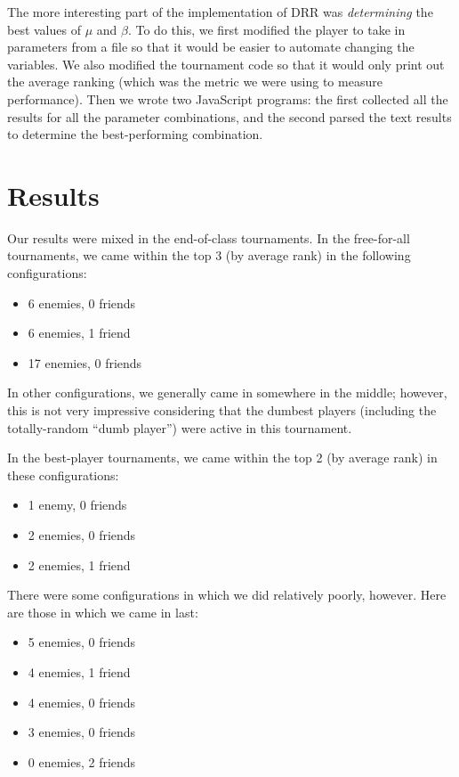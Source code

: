 \documentclass[
10pt, %
letterpaper, %
oneside, %
headinclude,footinclude, %
english
]{article}
\begin{document}
The more interesting part of the implementation of DRR was \textit{determining} the best values of $\mu$ and $\beta$. To do this, we first modified the player to take in parameters from a file so that it would be easier to automate changing the variables. We also modified the tournament code so that it would only print out the average ranking (which was the metric we were using to measure performance). Then we wrote two JavaScript programs: the first collected all the results for all the parameter combinations, and the second parsed the text results to determine the best-performing combination.

\section{Results}
Our results were mixed in the end-of-class tournaments. In the free-for-all tournaments, we came within the top 3 (by average rank) in the following configurations:
\begin{itemize}
  \item 6 enemies, 0 friends
  \item 6 enemies, 1 friend
  \item 17 enemies, 0 friends
\end{itemize}

In other configurations, we generally came in somewhere in the middle; however, this is not very impressive considering that the dumbest players (including the totally-random ``dumb player'') were active in this tournament.

In the best-player tournaments, we came within the top 2 (by average rank) in these configurations:
\begin{itemize}
  \item 1 enemy, 0 friends
  \item 2 enemies, 0 friends
  \item 2 enemies, 1 friend
\end{itemize}

There were some configurations in which we did relatively poorly, however. Here are those in which we came in last:
\begin{itemize}
  \item 5 enemies, 0 friends
  \item 4 enemies, 1 friend
  \item 4 enemies, 0 friends
  \item 3 enemies, 0 friends
  \item 0 enemies, 2 friends
\end{itemize}
\end{document}
